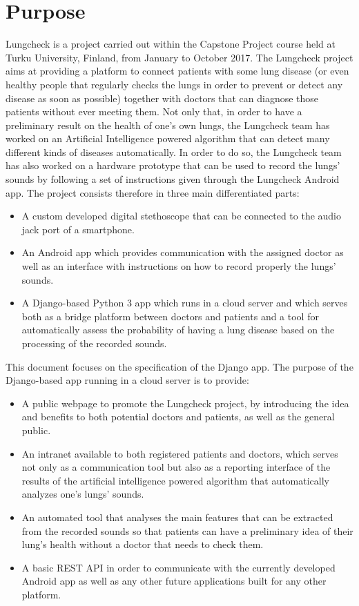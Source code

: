 \documentclass{scrreprt}
\begin{document}
\section{Purpose}
Lungcheck is a project carried out within the Capstone Project course held at Turku University, Finland, from January to October 2017. The Lungcheck project aims at providing a platform to connect patients with some lung disease (or even healthy people that regularly checks the lungs in order to prevent or detect any disease as soon as possible) together with doctors that can diagnose those patients without ever meeting them. Not only that, in order to have a preliminary result on the health of one's own lungs, the Lungcheck team has worked on an Artificial Intelligence powered algorithm that can detect many different kinds of diseases automatically. In order to do so, the Lungcheck team has also worked on a hardware prototype that can be used to record the lungs' sounds by following a set of instructions given through the Lungcheck Android app. The project consists therefore in three main differentiated parts:
\begin{itemize}
 \item A custom developed digital stethoscope that can be connected to the audio jack port of a smartphone.
 \item An Android app which provides communication with the assigned doctor as well as an interface with instructions on how to record properly the lungs' sounds.
 \item A Django-based Python 3 app which runs in a cloud server and which serves both as a bridge platform between doctors and patients and a tool for automatically assess the probability of having a lung disease based on the processing of the recorded sounds. 
\end{itemize}

$ $ \\
This document focuses on the specification of the Django app. The purpose of the Django-based app running in a cloud server is to provide:
\begin{itemize}
 \item A public webpage to promote the Lungcheck project, by introducing the idea and benefits to both potential doctors and patients, as well as the general public.
 \item An intranet available to both registered patients and doctors, which serves not only as a communication tool but also as a reporting interface of the results of the artificial intelligence powered algorithm that automatically analyzes one's lungs' sounds.
 \item An automated tool that analyses the main features that can be extracted from the recorded sounds so that patients can have a preliminary idea of their lung's health without a doctor that needs to check them.
 \item A basic REST API in order to communicate with the currently developed Android app as well as any other future applications built for any other platform.
\end{itemize}
\end{document}
